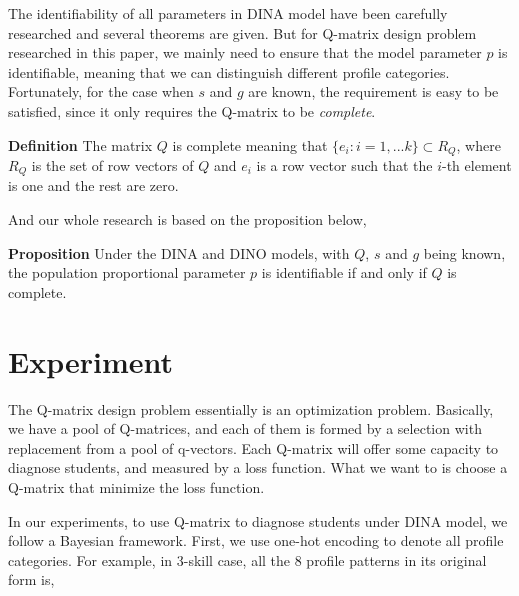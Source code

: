 \documentclass{edm_template}
\begin{document}
The identifiability of all parameters in DINA model have been carefully researched and several theorems are given\cite{xu2015identifiability}. But for Q-matrix design problem researched in this paper, we mainly need to ensure that the model parameter $p$ is identifiable, meaning that we can distinguish different profile categories. Fortunately, for the case when $s$ and $g$ are known, the requirement is easy to be satisfied, since it only requires the Q-matrix to be \textit{complete}.

\textbf{Definition} \cite{xu2015identifiability}  The matrix $Q$ is complete meaning that $\{e_{i}:i=1,...k\} \subset R_{Q}$, where $R_{Q}$ is the set of row vectors of $Q$ and $e_{i}$ is a row vector such that the $i$-th element is one and the rest are zero.

And our whole research is based on the proposition below,

\textbf{Proposition} \cite{xu2015identifiability} Under the DINA and DINO models, with $Q$, $s$ and $g$ being known, the population proportional parameter $p$ is identifiable if and only if $Q$ is complete.

   
%


\section{Experiment}
The Q-matrix design problem essentially is an optimization problem. Basically, we have a pool of Q-matrices, and each of them is formed by a selection with replacement from a pool of q-vectors. Each Q-matrix will offer some capacity to diagnose students, and measured by a loss function. What we want to is choose a Q-matrix that minimize the loss function.

In our experiments, to use Q-matrix to diagnose students under DINA model, we follow a Bayesian framework. First, we use one-hot encoding to denote all profile categories. For example, in 3-skill case, all the 8 profile patterns in its original form is,
\end{document}

